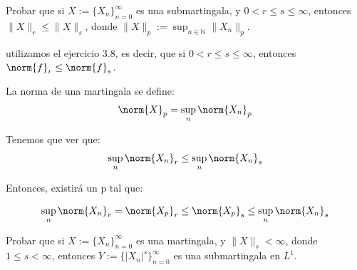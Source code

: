 \begin{problem}[2]  Probar que si $X := \{X_n\}_{n=0}^{\infty}$  es una submartingala, y
$0  <  r\le s\le \infty$, entonces $\|X\|_r  \le \|X\|_s$, donde 
$\|X\|_p := \sup_{n\in \mathbb{N}} \|X_n\|_{p}$. 
\solution

\begin{expla}
utilizamos el ejercicio 3.8, es decir, que si $0<r\leq s \leq \infty$, entonces $\norm{f}_r \leq \norm{f}_s$.

La norma de una martingala se define:
\[
\norm{X}_p = \sup_n \norm{X_n}_p
\]
\end{expla}

Tenemos que ver que:
\[
\sup_n \norm{X_n}_r \leq \sup_n \norm{X_n}_s
\]

Entonces, existirá un p tal que:

\[
\sup_n \norm{X_n}_r  = \norm{X_p}_r \leq \norm{X_p}_s \leq \sup_n \norm{X_n}_s
\]

\end{problem}


\begin{problem}[3] Probar que si $X := \{X_n\}_{n=0}^{\infty}$  es una martingala, y $ \|X\|_s <\infty$, donde 
$1\le s < \infty$, entonces  $Y := \{|X_n|^s\}_{n=0}^{\infty}$  es una submartingala
en $L^1$. 
\solution

\begin{expla}

\end{expla}

\end{problem}


